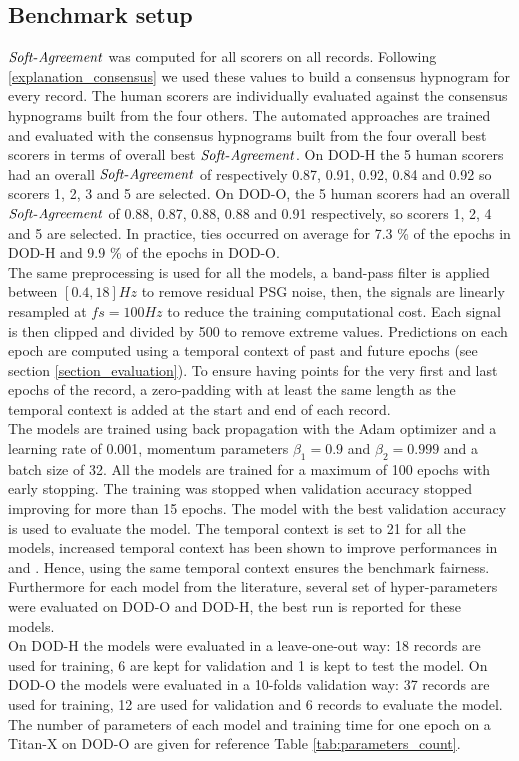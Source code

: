 \documentclass[journal]{IEEEtran}
\begin{document}
\subsection{Benchmark setup}  \label{experiment:setup}
\label{benchmark-setup}
${\operatorname{\mathit{Soft-Agreement}}}$ was computed for all scorers on all records. Following \ref{explanation_consensus} we used these values to build a consensus hypnogram for every record. The human scorers are individually evaluated against the consensus hypnograms built from the four others. The automated approaches are trained and evaluated with the consensus hypnograms built from the four overall best scorers in terms of overall best ${\operatorname{\mathit{Soft-Agreement}}}$. On DOD-H the 5 human scorers had an overall ${\operatorname{\mathit{Soft-Agreement}}}$ of respectively 0.87, 0.91, 0.92, 0.84 and 0.92 so scorers 1, 2, 3 and 5 are selected. On DOD-O, the 5 human scorers had an overall ${\operatorname{\mathit{Soft-Agreement}}}$ of 0.88, 0.87, 0.88, 0.88 and 0.91 respectively, so scorers 1, 2, 4 and 5 are selected. In practice, ties occurred on average for 7.3 \% of the epochs in DOD-H and 9.9 \% of the epochs in DOD-O.\\
The same preprocessing is used for all the models, a band-pass filter is applied between $[0.4,18] Hz$ to remove residual PSG noise, then, the signals are linearly resampled at $fs = 100 Hz$ to reduce the training computational cost. Each signal is then clipped and divided by 500 to remove extreme values. Predictions on each epoch are computed using a temporal context of past and future epochs (see section \ref{section_evaluation}). To ensure having points for the very first and last epochs of the record, a zero-padding with at least the same length as the temporal context is added at the start and end of each record.  \\
The models are trained using back propagation with the Adam optimizer and a learning rate of 0.001, momentum parameters $\beta_1=0.9$ and $\beta_2=0.999$ and a batch size of 32. All the models are trained for a maximum of 100 epochs with early stopping. The training was stopped when validation accuracy stopped improving for more than 15 epochs. The model with the best validation accuracy is used to evaluate the model. The temporal context is set to 21 for all the models, increased temporal context has been shown to improve performances in \cite{Chambon2018} and \cite{Phan2018c}. Hence, using the same temporal context ensures the benchmark fairness. Furthermore for each model from the literature, several set of hyper-parameters were evaluated on DOD-O and DOD-H, the best run is reported for these models. \\
On DOD-H the models were evaluated in a leave-one-out way: 18 records are used for training, 6 are kept for validation and 1 is kept to test the model. On DOD-O the models were evaluated in a 10-folds validation way: 37 records are used for training, 12 are used for validation and 6 records to evaluate the model.\\
The number of parameters of each model and training time for one epoch on a Titan-X on DOD-O are given for reference Table \ref{tab:parameters_count}.
\end{document}
